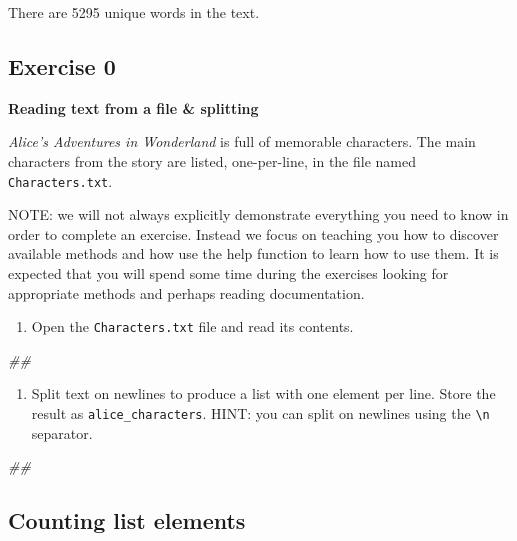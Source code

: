 \documentclass[
]{book}
\newenvironment{Shaded}{\begin{snugshade}}{\end{snugshade}}
\newcommand{\CommentTok}[1]{\textcolor[rgb]{0.56,0.35,0.01}{\textit{#1}}}
\providecommand{\tightlist}{%
  \setlength{\itemsep}{0pt}\setlength{\parskip}{0pt}}
\begin{document}
There are 5295 unique words in the text.

\hypertarget{exercise-0-3}{%
\subsection{Exercise 0}\label{exercise-0-3}}

\textbf{Reading text from a file \& splitting}

\emph{Alice's Adventures in Wonderland} is full of memorable characters. The main characters from the story are listed, one-per-line, in the file named \texttt{Characters.txt}.

NOTE: we will not always explicitly demonstrate everything you need to know in order to complete an exercise. Instead we focus on teaching you how to discover available methods and how use the help function to learn how to use them. It is expected that you will spend some time during the exercises looking for appropriate methods and perhaps reading documentation.

\begin{enumerate}
\def\labelenumi{\arabic{enumi}.}
\tightlist
\item
  Open the \texttt{Characters.txt} file and read its contents.
\end{enumerate}

\begin{Shaded}
\begin{Highlighting}[]
\CommentTok{##}
\end{Highlighting}
\end{Shaded}

\begin{enumerate}
\def\labelenumi{\arabic{enumi}.}
\setcounter{enumi}{1}
\tightlist
\item
  Split text on newlines to produce a list with one element per line. Store the result as \texttt{alice\_characters}. HINT: you can split on newlines using the \texttt{\textbackslash{}n} separator.
\end{enumerate}

\begin{Shaded}
\begin{Highlighting}[]
\CommentTok{##}
\end{Highlighting}
\end{Shaded}

\hypertarget{counting-list-elements}{%
\subsection{Counting list elements}\label{counting-list-elements}}
\end{document}
